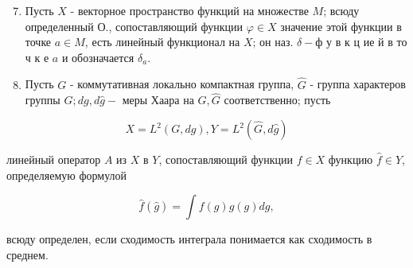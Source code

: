 \documentclass[10pt]{article}
\begin{document}
\begin{enumerate}
  \setcounter{enumi}{6}
  \item Пусть $X$ - векторное пространство функций на множестве $M$; всюду определенный О., сопоставляющий функции $\varphi \in X$ значение этой функции в точке $a \in M$, есть линейный функционал на $X$; он наз. $\delta-ф$ у в к ц ие й в то ч к е $a$ и обозначается $\delta_{a}$.

  \item Пусть $G$ - коммутативная локально компактная группа, $\hat{G}$ - группа характеров группы $G ; d g, d \hat{g}-$ меры Хаара на $G, \widehat{G}$ соответственно; пусть

\end{enumerate}

\[
X=L^{2}(G, d g), Y=L^{2}(\widehat{G}, d \hat{g})
\]

линейный оператор $A$ из $X$ в $Y$, сопоставляющий функции $f \in X$ функцию $\hat{f} \in Y$, определяемую формулой

\[
\hat{f}(\hat{g})=\int f(g) \hat{g}(g) d g,
\]

всюду определен, если сходимость интеграла понимается как сходимость в среднем.
\end{document}
